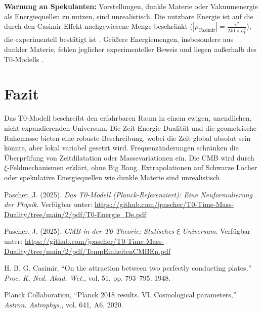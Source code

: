 \documentclass[12pt,a4paper]{article}
\begin{document}
	\textbf{Warnung an Spekulanten:} Vorstellungen, dunkle Materie oder Vakuumenergie als Energiequellen zu nutzen, sind unrealistisch. Die nutzbare Energie ist auf die durch den Casimir-Effekt nachgewiesene Menge beschränkt (\( |\rho_{\text{Casimir}}| = \frac{\pi^2}{240 \times L_\xi^4} \)), die experimentell bestätigt ist \cite{Casimir1948}. Größere Energiemengen, insbesondere aus dunkler Materie, fehlen jeglicher experimenteller Beweis und liegen außerhalb des T0-Modells \cite{pascher_t0_energie_2025}.
	
	\section{Fazit}
	Das T0-Modell beschreibt den erfahrbaren Raum in einem ewigen, unendlichen, nicht expandierenden Universum. Die Zeit-Energie-Dualität und die geometrische Ruhemasse bieten eine robuste Beschreibung, wobei die Zeit global absolut sein könnte, aber lokal variabel gesetzt wird. Frequenzänderungen schränken die Überprüfung von Zeitdilatation oder Massevariationen ein. Die CMB wird durch \(\xi\)-Feldmechanismen erklärt, ohne Big Bang. Extrapolationen auf Schwarze Löcher oder spekulative Energiequellen wie dunkle Materie sind unrealistisch \cite{pascher_t0_energie_2025}
		
		\begin{thebibliography}{9}
			Pascher, J. (2025). \textit{Das T0-Modell (Planck-Referenziert): Eine Neuformulierung der Physik}. Verfügbar unter: \url{https://github.com/jpascher/T0-Time-Mass-Duality/tree/main/2/pdf/T0-Energie_De.pdf}
			
			Pascher, J. (2025). \textit{CMB in der T0-Theorie: Statisches \(\xi\)-Universum}. Verfügbar unter: \url{https://github.com/jpascher/T0-Time-Mass-Duality/tree/main/2/pdf/TempEinheitenCMBEn.pdf}
			
			H. B. G. Casimir, ``On the attraction between two perfectly conducting plates,'' \emph{Proc. K. Ned. Akad. Wet.}, vol. 51, pp. 793--795, 1948.
			
			Planck Collaboration, ``Planck 2018 results. VI. Cosmological parameters,'' \emph{Astron. Astrophys.}, vol. 641, A6, 2020.
		\end{thebibliography}
		
	
\end{document}
